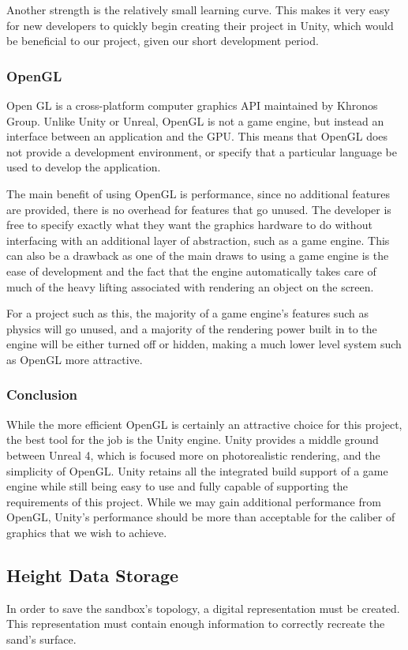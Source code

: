 Another strength is the relatively small learning curve. 
This makes it very easy for new developers to quickly begin creating their project in Unity, which would be beneficial to our project, given our short development period.

\subsubsection{OpenGL}
Open GL is a cross-platform computer graphics API maintained by Khronos Group. Unlike Unity or Unreal, OpenGL is not a game engine, but instead an interface between an application and the GPU. This means that OpenGL does not provide a development environment, or specify that a particular language be used to develop the application. 

The main benefit of using OpenGL is performance, since no additional features are provided, there is no overhead for features that go unused. The developer is free to specify exactly what they want the graphics hardware to do without interfacing with an additional layer of abstraction, such as a game engine. This can also be a drawback as one of the main draws to using a game engine is the ease of development and the fact that the engine automatically takes care of much of the heavy lifting associated with rendering an object on the screen. 

For a project such as this, the majority of a game engine's features such as physics will go unused, and a majority of the rendering power built in to the engine will be either turned off or hidden, making a much lower level system such as OpenGL more attractive. 

\subsubsection{Conclusion}
While the more efficient OpenGL is certainly an attractive choice for this project, the best tool for the job is the Unity engine. Unity provides a middle ground between Unreal 4, which is focused more on photorealistic rendering, and the simplicity of OpenGL. Unity retains all the integrated build support of a game engine while still being easy to use and fully capable of supporting the requirements of this project. While we may gain additional performance from OpenGL, Unity's performance should be more than acceptable for the caliber of graphics that we wish to achieve. 

\subsection{Height Data Storage}
In order to save the sandbox's topology, a digital representation must be created. This representation must contain enough information to correctly recreate the sand's surface.

